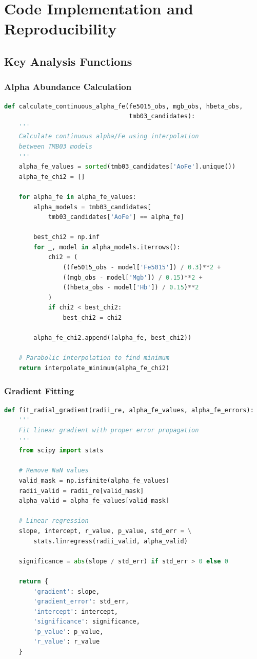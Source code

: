 \documentclass[12pt,a4paper]{article}
\begin{document}
\section{Code Implementation and Reproducibility}

\subsection{Key Analysis Functions}

\subsubsection{Alpha Abundance Calculation}
\begin{lstlisting}[language=Python]
def calculate_continuous_alpha_fe(fe5015_obs, mgb_obs, hbeta_obs, 
                                  tmb03_candidates):
    '''
    Calculate continuous alpha/Fe using interpolation 
    between TMB03 models
    '''
    alpha_fe_values = sorted(tmb03_candidates['AoFe'].unique())
    alpha_fe_chi2 = []
    
    for alpha_fe in alpha_fe_values:
        alpha_models = tmb03_candidates[
            tmb03_candidates['AoFe'] == alpha_fe]
        
        best_chi2 = np.inf
        for _, model in alpha_models.iterrows():
            chi2 = (
                ((fe5015_obs - model['Fe5015']) / 0.3)**2 +
                ((mgb_obs - model['Mgb']) / 0.15)**2 +
                ((hbeta_obs - model['Hb']) / 0.15)**2
            )
            if chi2 < best_chi2:
                best_chi2 = chi2
        
        alpha_fe_chi2.append((alpha_fe, best_chi2))
    
    # Parabolic interpolation to find minimum
    return interpolate_minimum(alpha_fe_chi2)
\end{lstlisting}

\subsubsection{Gradient Fitting}
\begin{lstlisting}[language=Python]
def fit_radial_gradient(radii_re, alpha_fe_values, alpha_fe_errors):
    '''
    Fit linear gradient with proper error propagation
    '''
    from scipy import stats
    
    # Remove NaN values
    valid_mask = np.isfinite(alpha_fe_values)
    radii_valid = radii_re[valid_mask]
    alpha_valid = alpha_fe_values[valid_mask]
    
    # Linear regression
    slope, intercept, r_value, p_value, std_err = \
        stats.linregress(radii_valid, alpha_valid)
    
    significance = abs(slope / std_err) if std_err > 0 else 0
    
    return {
        'gradient': slope,
        'gradient_error': std_err,
        'intercept': intercept,
        'significance': significance,
        'p_value': p_value,
        'r_value': r_value
    }
\end{lstlisting}
\end{document}
